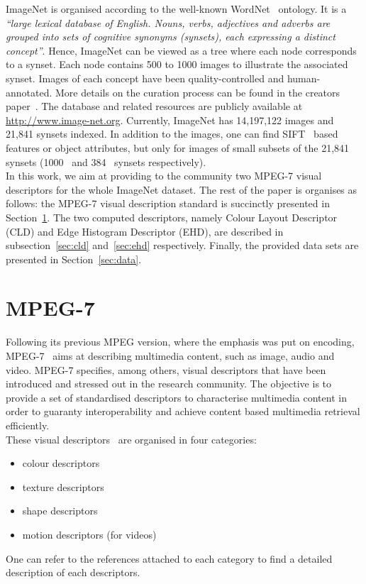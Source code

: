 \documentclass[conference]{IEEEtran}
\begin{document}
ImageNet is organised according to the well-known WordNet~\cite{Fellbaum:1998} ontology. It is a \textit{``large lexical database of English. Nouns, verbs, adjectives and adverbs are grouped into sets of cognitive synonyms (synsets), each expressing a distinct concept''}. Hence, ImageNet can be viewed as a tree where each node corresponds to a synset. Each node contains 500 to 1000 images to illustrate the associated synset. Images of each concept have been quality-controlled and human-annotated. More details on the curation process can be found in the creators paper~\cite{Deng:2009}. The database and related resources are publicly available at \url{http://www.image-net.org}. Currently, ImageNet has 14,197,122 images and 21,841 synsets indexed. In addition to the images, one can find SIFT~\cite{Lowe:2004} based features or object attributes, but only for images of small subsets of the 21,841 synsets (1000~\cite{ImageNet:sbow} and 384~\cite{ImageNet:oa} synsets respectively).\\

In this work, we aim at providing to the community two MPEG-7 visual descriptors for the whole ImageNet dataset. The rest of the paper is organises as follows: the MPEG-7 visual description standard is succinctly presented in Section~\ref{sec:mpeg}. The two computed descriptors, namely Colour Layout Descriptor (CLD) and Edge Histogram Descriptor (EHD), are described in subsection~\ref{sec:cld} and~\ref{sec:ehd} respectively. Finally, the provided data sets are presented in Section~\ref{sec:data}.\\


\section{MPEG-7}
\label{sec:mpeg}
Following its previous MPEG version, where the emphasis was put on encoding, MPEG-7~\cite{Manjunath:2002} aims at describing multimedia content, such as image, audio and video.
MPEG-7 specifies, among others, visual descriptors that have been introduced and stressed out in the research community. The objective is to provide a set of
standardised descriptors to characterise multimedia content in order to guaranty interoperability and achieve content based multimedia retrieval efficiently. \\

These visual descriptors~\cite{Sikora:2001} are organised in four categories:
\begin{itemize}
	\item colour descriptors~\cite{Manjunath:2001}
	\item texture descriptors~\cite{Manjunath:2001}
	\item shape descriptors~\cite{Bober:2001}
	\item motion descriptors (for videos)~\cite{Jeannin:2001}
\end{itemize}
One can refer to the references attached to each category to find a detailed description of each descriptors.\\
\end{document}
